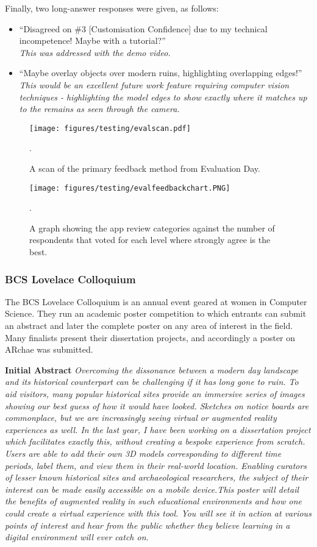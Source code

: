 \documentclass[12pt, a4paper]{article}
\begin{document}
Finally, two long-answer responses were given, as follows:
\begin{itemize}
    \item ``Disagreed on \#3 [Customisation Confidence] due to my technical incompetence! Maybe with a tutorial?''\\
    \textit{This was addressed with the demo video.}
    \item ``Maybe overlay objects over modern ruins, highlighting overlapping edges!'' \\
    \textit{This would be an excellent future work feature requiring computer vision techniques - highlighting the model edges to show exactly where it matches up to the remains as seen through the camera.}
\end{itemize}

\begin{figure}
    \texttt{[image: figures/testing/evalscan.pdf]}
        \caption{A scan of the primary feedback method from Evaluation Day.}.
        \label{fig:evalscan}
\end{figure}

\begin{figure}
    \texttt{[image: figures/testing/evalfeedbackchart.PNG]}
        \caption{A graph showing the app review categories against the number of respondents that voted for each level where strongly agree is the best.}.
        \label{fig:evalplot}
\end{figure}

\subsubsection{BCS Lovelace Colloquium}
The BCS Lovelace Colloquium is an annual event geared at women in Computer Science. They run an academic poster competition to which entrants can submit an abstract and later the complete poster on any area of interest in the field. Many finalists present their dissertation projects, and accordingly a poster on ARchae was submitted. 

\textbf{Initial Abstract} \textit{Overcoming the dissonance between a modern day landscape and its historical counterpart can be challenging if it has long gone to ruin. To aid visitors, many popular historical sites provide an immersive series of images showing our best guess of how it would have looked. Sketches on notice boards are commonplace, but we are increasingly seeing virtual or augmented reality experiences as well. In the last year, I have been working on a dissertation project which facilitates exactly this, without creating a bespoke experience from scratch. Users are able to add their own 3D models corresponding to different time periods, label them, and view them in their real-world location. Enabling curators of lesser known historical sites and archaeological researchers, the subject of their interest can be made easily accessible on a mobile device.This poster will detail the benefits of augmented reality in such educational environments and how one could create a virtual experience with this tool. You will see it in action at various points of interest and hear from the public whether they believe learning in a digital environment will ever catch on.}
\end{document}
